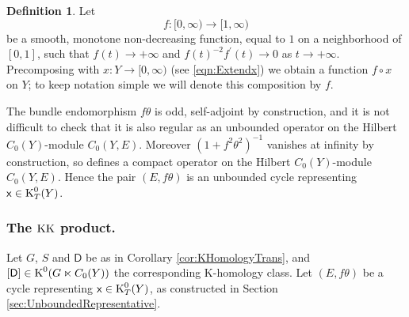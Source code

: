 \documentclass[11pt,reqno]{amsart}
\theoremstyle{definition}
\newtheorem{definition}[theorem]{Definition}
\theoremstyle{remark}
\newcommand{\st}[1]{\mathsf{#1}}
\def\K{\ensuremath{\mathcal{K}}}
\def\KK{\ensuremath{\textnormal{KK}}}
\def\K{\ensuremath{\textnormal{K}}}
\begin{document}
\begin{definition}
\label{def:fcnf}
Let
\[ f\colon [0,\infty) \rightarrow [1,\infty) \]
be a smooth, monotone non-decreasing function, equal to $1$ on a neighborhood of $[0,1]$, such that $f(t) \rightarrow +\infty$ and $f(t)^{-2}f^\prime(t) \rightarrow 0$ as $t \rightarrow +\infty$.  Precomposing with $x \colon Y \rightarrow [0,\infty)$ (see \eqref{eqn:Extendx}) we obtain a function $f \circ x$ on $Y$; to keep notation simple we will denote this composition by $f$.
\end{definition}

The bundle endomorphism $f\theta$ is odd, self-adjoint by construction, and it is not difficult to check that it is also regular as an unbounded operator on the Hilbert $C_0(Y)$-module $C_0(Y,E)$.  Moreover $(1+f^2\theta^2)^{-1}$ vanishes at infinity by construction, so defines a compact operator on the Hilbert $C_0(Y)$-module $C_0(Y,E)$.  Hence the pair $(E,f\theta)$ is an unbounded cycle representing $\st{x} \in \K^0_T(Y)$.

\subsubsection{The $\KK$ product.}\label{sec:CapProduct}
Let $G$, $S$ and $\st{D}$ be as in Corollary \ref{cor:KHomologyTrans}, and $[\st{D}] \in \K^0(G\ltimes C_0(Y))$ the corresponding K-homology class.  Let $(E,f\theta)$ be a cycle representing $\st{x} \in \K^0_T(Y)$, as constructed in Section \ref{sec:UnboundedRepresentative}.
\end{document}
